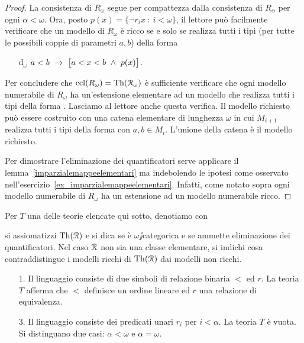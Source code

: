 \begin{proof}
La consistenza di $R_\omega$ segue per compattezza dalla consistenza di $R_\alpha$ per ogni $\alpha<\omega$. Ora, posto $p(x) = \{\neg r_ix\ :\ i<\omega\}$, il lettore pu\`o facilmente verificare che un modello di $R_\omega$ \`e ricco se e solo se realizza tutti i tipi  (per tutte le possibili coppie di parametri $a,b$) della forma

\begin{itemize}
\item[d$_\omega$] $\displaystyle a<b\ \rightarrow\ \big[ a<x<b\ \wedge\ p(x)\big]$.
\end{itemize}

Per concludere che ${\rm ccl}(R_\omega)=\textrm{Th}(\EuScript R_\omega)$ \`e sufficiente verificare che ogni modello numerabile di $R_\omega$ ha un'estensione elementare ad un modello che realizza tutti i tipi della forma . Lasciamo al lettore anche questa verifica. Il modello richiesto pu\`o essere costruito con una catena elementare di lunghezza $\omega$ in cui $M_{i+1}$ realizza tutti i tipi della forma  con $a,b\in M_i$. L'unione della catena \`e il modello richiesto. 

Per dimostrare l'eliminazione dei quantificatori serve applicare il lemma~\ref{imparzialemappeelementari} ma indebolendo le ipotesi come osservato nell'esercizio~\ref{ex_imparzialemappeelementari}. Infatti, come notato sopra ogni modello numerabile di $R_\omega$ ha un estensione ad un modello numerabile ricco.
\end{proof}






\begin{exercise}\label{ex_infiniti_colori_1}
Per $T$ una delle teorie elencate qui sotto, denotiamo con 


si assiomatizzi $\textrm{Th}(\EuScript R)$ e si dica se \`e $\omega\jj$categorica e se ammette eliminazione dei quantificatori. Nel caso $\EuScript R$ non sia una classe elementare, si indichi cosa contraddistingue i modelli ricchi di $\textrm{Th}(\EuScript R)$ dai modelli non ricchi.


\begin{itemize}
\item[1.] Il linguaggio consiste di due simboli di relazione binaria $<$ ed $r$. La teoria $T$ afferma che $<$ definisce un ordine lineare ed $r$ una relazione di equivalenza.
\item[3.] Il linguaggio consiste dei predicati unari $r_i$ per $i<\alpha$.  La teoria $T$ \`e vuota.  Si distinguano due casi: $\alpha<\omega$ e $\alpha=\omega$.\QED
\end{itemize}
\end{exercise}

